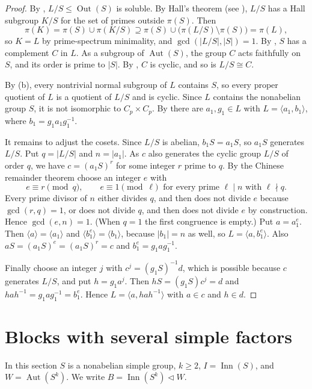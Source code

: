 \documentclass[11pt,colorlinks]{charlie}
\DeclareMathOperator{\Aut}{Aut}
\DeclareMathOperator{\Inn}{Inn}
\DeclareMathOperator{\Out}{Out}
\newcommand{\gen}[1]{\langle #1\rangle}
\begin{document}
\begin{proof}
By , $L/S\le\Out(S)$ is soluble. By Hall's theorem (see \cite[Chapter~3]{Isaacs}), $L/S$ has a Hall subgroup $K/S$ for the set of primes outside $\pi(S)$. Then
\[
 \pi(K)=\pi(S)\cup\pi(K/S)\supseteq\pi(S)\cup\bigl(\pi(L/S)\setminus\pi(S)\bigr)=\pi(L),
\]
so $K=L$ by prime-spectrum minimality, and $\gcd(|L/S|,|S|)=1$. By , $S$ has a complement $C$ in $L$. As a subgroup of $\Aut(S)$, the group $C$ acts faithfully on $S$, and its order is prime to $|S|$. By , $C$ is cyclic, and so is $L/S\cong C$.

By (b), every nontrivial normal subgroup of $L$ contains $S$, so every proper quotient of $L$ is a quotient of $L/S$ and is cyclic. Since $L$ contains the nonabelian group $S$, it is not isomorphic to $C_p\times C_p$. By  there are $a_1,g_1\in L$ with $L=\gen{a_1,b_1}$, where $b_1=g_1a_1g_1^{-1}$.

It remains to adjust the cosets. Since $L/S$ is abelian, $b_1S=a_1S$, so $a_1S$ generates $L/S$. Put $q=|L/S|$ and $n=|a_1|$. As $c$ also generates the cyclic group $L/S$ of order $q$, we have $c=(a_1S)^r$ for some integer $r$ prime to $q$. By the Chinese remainder theorem choose an integer $e$ with
\[
 e\equiv r\pmod q,\qquad e\equiv1\pmod\ell\ \text{ for every prime }\ell\mid n\text{ with }\ell\nmid q .
\]
Every prime divisor of $n$ either divides $q$, and then does not divide $e$ because $\gcd(r,q)=1$, or does not divide $q$, and then does not divide $e$ by construction. Hence $\gcd(e,n)=1$. (When $q=1$ the first congruence is empty.) Put $a=a_1^e$. Then $\gen{a}=\gen{a_1}$ and $\gen{b_1^e}=\gen{b_1}$, because $|b_1|=n$ as well, so $L=\gen{a,b_1^e}$. Also $aS=(a_1S)^e=(a_1S)^r=c$ and $b_1^e=g_1ag_1^{-1}$.

Finally choose an integer $j$ with $c^j=(g_1S)^{-1}d$, which is possible because $c$ generates $L/S$, and put $h=g_1a^j$. Then $hS=(g_1S)c^j=d$ and $hah^{-1}=g_1ag_1^{-1}=b_1^e$. Hence $L=\gen{a,hah^{-1}}$ with $a\in c$ and $h\in d$.
\end{proof}

\section{Blocks with several simple factors}\label{sec:wreath}

In this section $S$ is a nonabelian simple group, $k\ge2$, $I=\Inn(S)$, and $W=\Aut(S^k)$. We write $B=\Inn(S^k)\lhd W$.
\end{document}
